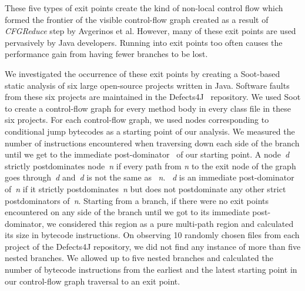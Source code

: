 These five types of exit points create the kind of non-local control flow which formed the frontier of the visible control-flow graph created as a result of \textit{CFGReduce} step by Avgerinos et al.
%
However, many of these exit points are used pervasively by Java developers.
%
%
Running into exit points too often causes the performance gain from having fewer branches to be lost.

We investigated the occurrence of these exit points by creating a
Soot-based~\cite{soot} static analysis of six large open-source projects written in Java.
%
Software faults from these six projects are maintained in the Defects4J~\cite{defects4j} repository.
%
We used Soot to create a control-flow graph for every method body in every class file in these six projects.
%
For each control-flow graph, we used nodes corresponding to conditional jump bytecodes as a starting point of our analysis.
%
We measured the number of instructions encountered when traversing down
each side of the branch until we get to the immediate post-dominator~\cite{dragon-book} of our starting point.
%
A node~\textit{d} strictly postdominates node~\textit{n} if every path from
\textit{n} to the exit node of the graph goes through~\textit{d}
and~\textit{d} is not the same as ~\textit{n}.
%
~\textit{d} is an immediate post-dominator of~\textit{n} if
it strictly postdominates~\textit{n} but does not postdominate any other
strict postdominators of~\textit{n}.
%
Starting from a branch, if there were no exit points encountered on any
side of the branch until we got to its immediate post-dominator, we considered this region as a pure multi-path region and calculated its size in bytecode instructions.
%
On observing 10 randomly chosen files from each project of the Defects4J repository, we did not find any instance of more than five nested branches. 
%
We allowed up to five nested branches and calculated the number of
bytecode instructions from the earliest and the latest starting point in our control-flow graph traversal to an exit point.
%

